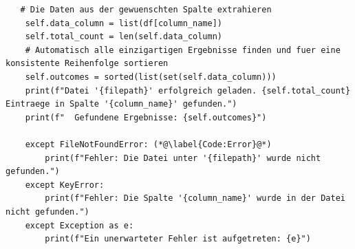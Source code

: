 \begin{lstlisting}
   # Die Daten aus der gewuenschten Spalte extrahieren
    self.data_column = list(df[column_name])
    self.total_count = len(self.data_column)
    # Automatisch alle einzigartigen Ergebnisse finden und fuer eine konsistente Reihenfolge sortieren
    self.outcomes = sorted(list(set(self.data_column)))
    print(f"Datei '{filepath}' erfolgreich geladen. {self.total_count} Eintraege in Spalte '{column_name}' gefunden.")
    print(f"  Gefundene Ergebnisse: {self.outcomes}")

    except FileNotFoundError: (*@\label{Code:Error}@*)
        print(f"Fehler: Die Datei unter '{filepath}' wurde nicht gefunden.")
    except KeyError:
        print(f"Fehler: Die Spalte '{column_name}' wurde in der Datei nicht gefunden.")
    except Exception as e:
        print(f"Ein unerwarteter Fehler ist aufgetreten: {e}")
   
\end{lstlisting}